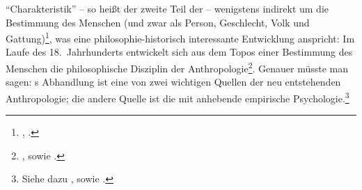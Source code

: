 \enquote{Charakteristik} -- so heißt der zweite Teil der 
-- wenigstens indirekt um die Bestimmung des Menschen (und zwar als Person,
Geschlecht, Volk und
Gattung)\footnote{\cite[Vgl.][B~253]{Kant:AnthropologieinpragmatischerHinsicht1977},
\cite[VII: 285.1--3]{Kant:GesammelteWerke1900ff.}.}, was eine
philosophie-historisch interessante Entwicklung anspricht:
Im Laufe des 18.\ Jahrhunderts entwickelt sich aus dem Topos einer Bestimmung
des Menschen die philosophische Disziplin der
Anthropologie\footnote{\cite[Vgl.][]{DAlessandro:DieWiederkehreinesLeitworts1999},
sowie
\cite[][138--140]{Tippmann:DieBestimmungdesMenschenbeiJohannJoachimSpalding2011}.}.
Genauer müsste man sagen:
s Abhandlung
ist eine von zwei wichtigen Quellen der neu entstehenden Anthropologie; die
andere Quelle ist die mit  anhebende
empirische Psychologie.\footnote{Siehe dazu
\cite{Bae:DieEntstehungderKantischenAnthropologieundihreBeziehungzurempirischenPsychologiederWolffschenSchule1994},
sowie
\cite{Hinske:WolffsempirischePsychologieundKantspragmatischeAnthropologie1999}.}

